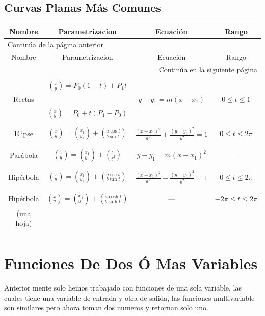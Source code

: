 \documentclass{article}
\begin{document}
\subsection{Curvas Planas Más Comunes}
\label{sec:org307a1ab}
\begin{longtable}{|c|c|c|c|}
\hline
Nombre & Parametrizacion & Ecuación & Rango\\
\hline
\endfirsthead
\multicolumn{4}{l}{Continúa de la página anterior} \\
\hline

Nombre & Parametrizacion & Ecuación & Rango \\

\hline
\endhead
\hline\multicolumn{4}{r}{Continúa en la siguiente página} \\
\endfoot
\endlastfoot
\hline
 &  &  & \\
 & \((^x_y)=P_0(1-t)+P_1t\) &  & \\
Rectas &  & \(y-y_1=m(x-x_1)\) & \(0\leq t\leq 1\)\\
 & \((^x_y)=P_0+t(P_1-P_0)\) &  & \\
 &  &  & \\
\hline
 &  &  & \\
Elipse & \((^x_y)=(^{x_1}_{y_1})+\left(^{a\cos t}_{b\sin t}\right)\) & \(\frac{(x-x_1)^2}{a^2}+\frac{(y-y_1)^2}{b^2}=1\) & \(0\leq t\leq 2\pi\)\\
 &  &  & \\
\hline
 &  &  & \\
Parábola & \((^x_y)=(^{x_1}_{y_1})+\left(^{t}_{t^2}\right)\) & \(y-y_1=m(x-x_1)^2\) & ---\\
 &  &  & \\
\hline
 &  &  & \\
Hipérbola & \((^x_y)=(^{x_1}_{y_1})+\left(^{a\sec t}_{b\tan t}\right)\) & \(\frac{(x-x_1)^2}{a^2}-\frac{(y-y_1)^2}{b^2}=1\) & \(0\leq t\leq 2\pi\)\\
 &  &  & \\
\hline
 &  &  & \\
Hipérbola & \((^x_y)=(^{x_1}_{y_1})+\left(^{a\cosh t}_{b\sinh t}\right)\) & --- & \(-2\pi\leq t\leq 2\pi\)\\
(una hoja) &  &  & \\
 &  &  & \\
\hline
\end{longtable}


\section{Funciones De Dos Ó Mas Variables}
\label{sec:orgb4e32e3}
Anterior mente solo hemos trabajado con funciones de una sola variable, las cuales tiene una variable de entrada y otra de salida, las funciones multivariable son similares pero ahora \uline{toman dos numeros y retornan solo uno}. 
\end{document}
